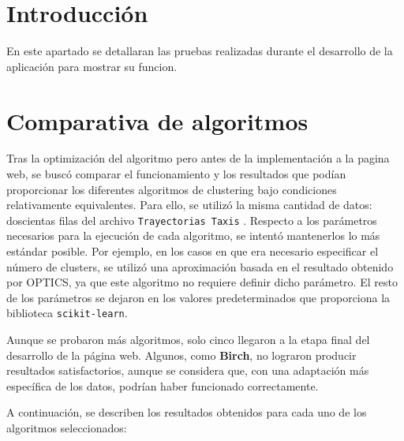 

\section{Introducción}

En este apartado se detallaran las pruebas realizadas durante el desarrollo de la aplicación para mostrar su funcion.

\section{Comparativa de algoritmos}

Tras la optimización del algoritmo pero antes de la implementación a la pagina web, se buscó comparar el funcionamiento y los resultados que podían proporcionar los diferentes algoritmos de clustering bajo condiciones relativamente equivalentes. Para ello, se utilizó la misma cantidad de datos: doscientas filas del archivo \texttt{Trayectorias Taxis} \cite{trayectorias_taxis}. Respecto a los parámetros necesarios para la ejecución de cada algoritmo, se intentó mantenerlos lo más estándar posible. Por ejemplo, en los casos en que era necesario especificar el número de clusters, se utilizó una aproximación basada en el resultado obtenido por OPTICS, ya que este algoritmo no requiere definir dicho parámetro. El resto de los parámetros se dejaron en los valores predeterminados que proporciona la biblioteca \texttt{scikit-learn}.

Aunque se probaron más algoritmos, solo cinco llegaron a la etapa final del desarrollo de la página web. Algunos, como \textbf{Birch}, no lograron producir resultados satisfactorios, aunque se considera que, con una adaptación más específica de los datos, podrían haber funcionado correctamente.

A continuación, se describen los resultados obtenidos para cada uno de los algoritmos seleccionados:

